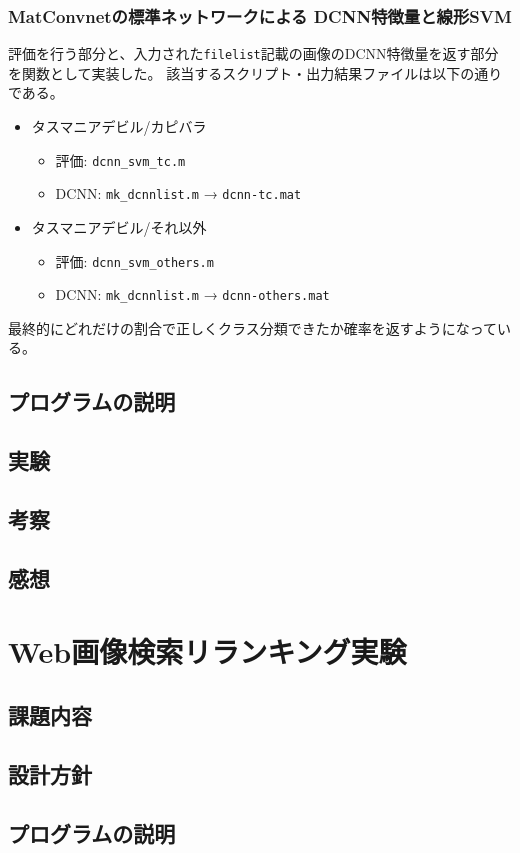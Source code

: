 \documentclass[11pt,a4paper, uplatex]{jsreport}
\begin{document}
\subsection{MatConvnetの標準ネットワークによる DCNN特徴量と線形SVM}
評価を行う部分と、入力された\texttt{filelist}記載の画像のDCNN特徴量を返す部分を関数として実装した。
該当するスクリプト・出力結果ファイルは以下の通りである。
\begin{itemize}
  \item タスマニアデビル/カピバラ
  \begin{itemize}
    \item 評価: \texttt{dcnn_svm_tc.m}
    \item DCNN: \texttt{mk_dcnnlist.m} → \texttt{dcnn-tc.mat}
  \end{itemize}
  \item タスマニアデビル/それ以外
  \begin{itemize}
    \item 評価: \texttt{dcnn_svm_others.m}
    \item DCNN: \texttt{mk_dcnnlist.m} → \texttt{dcnn-others.mat}
  \end{itemize}
\end{itemize}
最終的にどれだけの割合で正しくクラス分類できたか確率を返すようになっている。
\section{プログラムの説明}
\section{実験}
\section{考察}
\section{感想}
\chapter{Web画像検索リランキング実験}
\section{課題内容}
\section{設計方針}
\section{プログラムの説明}
\end{document}
